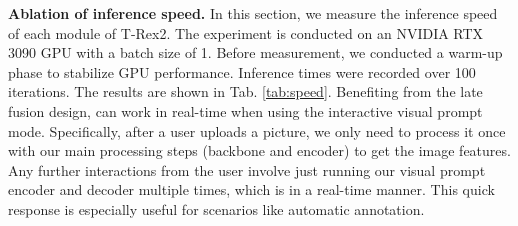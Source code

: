 \noindent\textbf{Ablation of inference speed.}
In this section, we measure the inference speed of each module of T-Rex2. The experiment is conducted on an NVIDIA RTX 3090 GPU with a batch size of 1. Before measurement, we conducted a warm-up phase to stabilize GPU performance. Inference times were recorded over 100 iterations. The results are shown in Tab. \ref{tab:speed}. Benefiting from the late fusion design, \ourmodel{} can work in real-time when using the interactive visual prompt mode. Specifically, after a user uploads a picture, we only need to process it once with our main processing steps (backbone and encoder) to get the image features. Any further interactions from the user involve just running our visual prompt encoder and decoder multiple times, which is in a real-time manner. This quick response is especially useful for scenarios like automatic annotation.

\begin{table}[]
  \centering
\caption{Time cost for each module in \ourmodel{}. Interactive FPS is the inference speed of the visual prompt encoder and the decoder. Since \ourmodel{} is a late fusion model, we only need to forward the backbone and encoder for once, and multi-round interactions only require running the prompt encoder and decoder.}
\label{tab:speed}
\end{table}

